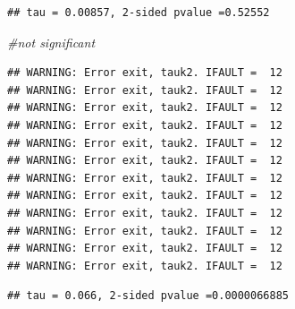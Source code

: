 \documentclass[
  12pt,
]{article}
\newenvironment{Shaded}{\begin{snugshade}}{\end{snugshade}}
\newcommand{\AttributeTok}[1]{\textcolor[rgb]{0.77,0.63,0.00}{#1}}
\newcommand{\CommentTok}[1]{\textcolor[rgb]{0.56,0.35,0.01}{\textit{#1}}}
\newcommand{\DecValTok}[1]{\textcolor[rgb]{0.00,0.00,0.81}{#1}}
\newcommand{\FunctionTok}[1]{\textcolor[rgb]{0.00,0.00,0.00}{#1}}
\newcommand{\NormalTok}[1]{#1}
\newcommand{\OtherTok}[1]{\textcolor[rgb]{0.56,0.35,0.01}{#1}}
\newcommand{\SpecialCharTok}[1]{\textcolor[rgb]{0.00,0.00,0.00}{#1}}
\begin{document}
\begin{verbatim}
## tau = 0.00857, 2-sided pvalue =0.52552
\end{verbatim}

\begin{Shaded}
\begin{Highlighting}[]
\CommentTok{\#not significant}
\end{Highlighting}
\end{Shaded}

\begin{Shaded}
\end{Shaded}

\begin{verbatim}
## WARNING: Error exit, tauk2. IFAULT =  12
## WARNING: Error exit, tauk2. IFAULT =  12
## WARNING: Error exit, tauk2. IFAULT =  12
## WARNING: Error exit, tauk2. IFAULT =  12
## WARNING: Error exit, tauk2. IFAULT =  12
## WARNING: Error exit, tauk2. IFAULT =  12
## WARNING: Error exit, tauk2. IFAULT =  12
## WARNING: Error exit, tauk2. IFAULT =  12
## WARNING: Error exit, tauk2. IFAULT =  12
## WARNING: Error exit, tauk2. IFAULT =  12
## WARNING: Error exit, tauk2. IFAULT =  12
## WARNING: Error exit, tauk2. IFAULT =  12
\end{verbatim}

\begin{verbatim}
## tau = 0.066, 2-sided pvalue =0.0000066885
\end{verbatim}

\begin{Shaded}
\end{Shaded}
\end{document}
